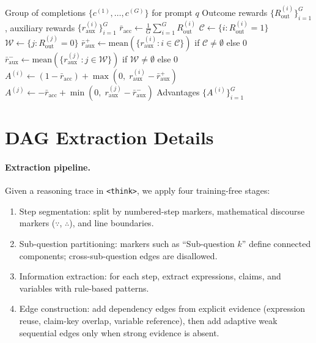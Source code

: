 \begin{algorithm}[H]
\caption{Stratified Clipping Advantage Estimator (SCAE)}
\label{alg:scae}
\begin{algorithmic}[1]
\Require Group of completions $\{c^{(1)}, \ldots, c^{(G)}\}$ for prompt $q$
\Require Outcome rewards $\{R_\mathrm{out}^{(i)}\}_{i=1}^G$, auxiliary rewards $\{r_\mathrm{aux}^{(i)}\}_{i=1}^G$
\State $\bar{r}_\mathrm{acc} \leftarrow \frac{1}{G}\sum_{i=1}^G R_\mathrm{out}^{(i)}$
\State $\mathcal{C} \leftarrow \{i : R_\mathrm{out}^{(i)} = 1\}$ 
\State $\mathcal{W} \leftarrow \{j : R_\mathrm{out}^{(j)} = 0\}$ 
\State $\bar{r}_\mathrm{aux}^+ \leftarrow \mathrm{mean}(\{r_\mathrm{aux}^{(i)} : i \in \mathcal{C}\})$ if $\mathcal{C} \neq \emptyset$ else $0$
\State $\bar{r}_\mathrm{aux}^- \leftarrow \mathrm{mean}(\{r_\mathrm{aux}^{(j)} : j \in \mathcal{W}\})$ if $\mathcal{W} \neq \emptyset$ else $0$
    \State $A^{(i)} \leftarrow (1 - \bar{r}_\mathrm{acc}) + \max(0,\; r_\mathrm{aux}^{(i)} - \bar{r}_\mathrm{aux}^+)$
\EndFor
{}
    \State $A^{(j)} \leftarrow -\bar{r}_\mathrm{acc} + \min(0,\; r_\mathrm{aux}^{(j)} - \bar{r}_\mathrm{aux}^-)$
\EndFor
\Return Advantages $\{A^{(i)}\}_{i=1}^G$
\end{algorithmic}
\end{algorithm}

\section{DAG Extraction Details}
\label{app:dag}

\paragraph{Extraction pipeline.}
Given a reasoning trace in \texttt{<think>}, we apply four training-free stages:
\begin{enumerate}[leftmargin=*,itemsep=1pt]
    \item Step segmentation: split by numbered-step markers, mathematical discourse markers ($\because$, $\therefore$), and line boundaries.
    \item Sub-question partitioning: markers such as ``Sub-question $k$'' define connected components; cross-sub-question edges are disallowed.
    \item Information extraction: for each step, extract expressions, claims, and variables with rule-based patterns.
    \item Edge construction: add dependency edges from explicit evidence (expression reuse, claim-key overlap, variable reference), then add adaptive weak sequential edges only when strong evidence is absent.
\end{enumerate}

